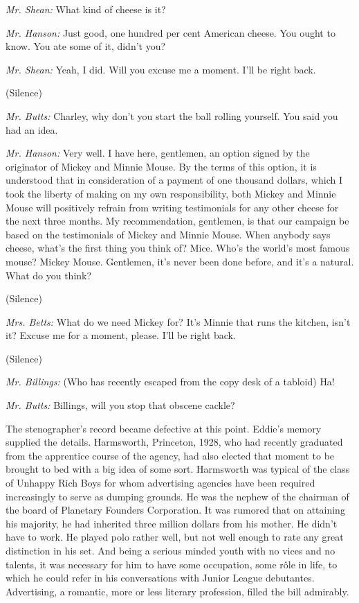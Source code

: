 \documentclass[openany,nobib]{tufte-book}
\begin{document}
\emph{Mr. Shean:} What kind of cheese is it?

\emph{Mr. Hanson:} Just good, one hundred per cent American cheese. You
ought to know. You ate some of it, didn't you?

\emph{Mr. Shean:} Yeah, I did. Will you excuse me a moment. I'll be
right back.

(Silence)

\emph{Mr. Butts:} Charley, why don't you start the ball rolling
yourself. You said you had an idea.

\emph{Mr. Hanson:} Very well. I have here, gentlemen, an option signed
by the originator of Mickey and Minnie Mouse. By the terms of this
option, it is understood that in consideration of a payment of one
thousand dollars, which I took the liberty of making on my own
responsibility, both Mickey and Minnie Mouse will positively refrain
from writing testimonials for any other cheese for the next three
months. My recommendation, gentlemen, is that our campaign be based on
the testimonials of Mickey and Minnie Mouse. When anybody says cheese,
what's the first thing you think of? Mice. Who's the world's most famous
mouse? Mickey Mouse. Gentlemen, it's never been done before, and it's a
natural. What do you think?

(Silence)

\emph{Mrs. Betts:} What do we need Mickey for? It's Minnie that runs the
kitchen, isn't it? Excuse me for a moment, please. I'll be right back.

(Silence)

\emph{Mr. Billings:} (Who has recently escaped from the copy desk of a
tabloid) Ha!

\emph{Mr. Butts:} Billings, will you stop that obscene cackle?

The stenographer's record became defective at this point. Eddie's memory
supplied the details. Harmsworth, Princeton, 1928, who had recently
graduated from the apprentice course of the agency, had also elected
that moment to be brought to bed with a big idea of some sort.
Harmsworth was typical of the class of Unhappy Rich Boys for whom
advertising agencies have been required increasingly to serve as dumping
grounds. He was the nephew of the chairman of the board of Planetary
Founders Corporation. It was rumored that on attaining his majority, he
had inherited three million dollars from his mother. He didn't have to
work. He played polo rather well, but not well enough to rate any great
distinction in his set. And being a serious minded youth with no vices
and no talents, it was necessary for him to have some occupation, some
r\^{o}le in life, to which he could refer in his conversations with Junior
League debutantes. Advertising, a romantic, more or less literary
profession, filled the bill admirably.
\end{document}
